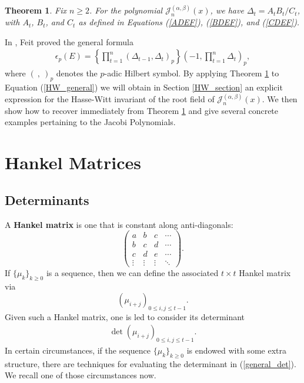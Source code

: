 \documentclass{amsart}
\theoremstyle{plain}
\newtheorem{thm}[equation]{Theorem}
\theoremstyle{remark}
\begin{document}
\begin{thm} \label{main_thm}
Fix $n \geq 2$.  For the polynomial  $\mathscr{J}_n^{(\alpha,\beta)}(x)$, we have $\Delta_{t} = A_{t}B_{t}/C_{t}$, with $A_t$, $B_t$, and $C_t$  as defined in Equations (\ref{ADEF}), (\ref{BDEF}), and (\ref{CDEF}).
\end{thm}

In \cite[Thm.~3.1]{feit}, Feit proved the general formula
\begin{align} \label{HW_general}
\epsilon_p(E) = \left\{ \prod_{t=1}^n \left( \Delta_{t-1},\Delta_{t} \right)_p \right\} \left( -1,\prod_{t=1}^n \Delta_{t} \right)_p,
\end{align}
where $(~,~)_p$ denotes the $p$-adic Hilbert symbol.  By applying Theorem \ref{main_thm} to Equation (\ref{HW_general}) we will obtain in Section \ref{HW_section} an explicit expression for the Hasse-Witt invariant of the root field of $\mathscr{J}_n^{(\alpha,\beta)}(x)$.  We then show how to recover \cite[Thm.~5.1]{feit} immediately from Theorem \ref{main_thm} and give several concrete examples pertaining to the Jacobi Polynomials.   

\section{Hankel Matrices}

\subsection{Determinants} A \textbf{Hankel matrix} is one that is constant along anti-diagonals:
\[
\begin{pmatrix} 
a & b & c & \cdots \\
b & c & d & \cdots \\
c & d & e &  \cdots \\
\vdots & \vdots & \vdots & \ddots
\end{pmatrix}.
\]
If $\lbrace \mu_k \rbrace_{k\geq 0}$ is a sequence, then we can define the associated $t \times t$ Hankel matrix via 
\[
\left( \mu_{i+j} \right)_{0 \leq i,j \leq t-1}.
\]
Given such a Hankel matrix, one is led to consider its determinant 
\begin{align} \label{general_det}
\det \left(\mu_{i+j}\right)_{0 \leq i,j \leq t-1}.
\end{align} 
In certain circumstances, if the sequence $\lbrace \mu_k \rbrace_{k \geq 0}$ is endowed with some extra structure, there are techniques for evaluating the determinant in (\ref{general_det}). We recall one of those circumstances now.
\end{document}
